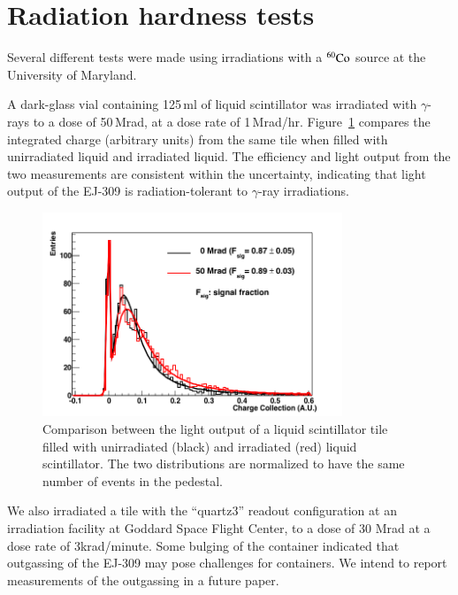 \documentclass[review]{elsarticle}
\begin{document}
\section{Radiation hardness tests}

Several different tests were made using irradiations with a
$\rm{^{60}Co}$ source at the University of Maryland.

A dark-glass vial containing 125\,ml
of liquid scintillator was irradiated with $\gamma$-rays to a
dose of 50\,Mrad, at a dose rate of 1\,Mrad/hr.
Figure~\ref{fig:ej309_irradiated} compares the integrated charge (arbitrary units)
from the same tile when filled with unirradiated liquid and irradiated liquid.
The efficiency and light output from the two measurements are
consistent within the uncertainty, indicating that light output of the EJ-309 is
radiation-tolerant to $\gamma$-ray irradiations.

\begin{figure}[!ht]
\begin{center}
\includegraphics[width=0.8\textwidth]{./figures/RD_R7600_1_0_DBF_ALM_GRS_TH450_100814_all_1.png}
\caption{Comparison between the light output of a liquid scintillator
  tile filled with unirradiated (black) and irradiated (red) liquid
  scintillator. The two distributions are normalized to have the same
  number of events in the pedestal.}
\label{fig:ej309_irradiated}
\end{center}
\end{figure}

We also irradiated a tile with the ``quartz3'' readout configuration
at an irradiation facility at Goddard Space Flight Center, to a dose of 30 Mrad
at a dose rate of 3krad/minute.
Some bulging of the container indicated that outgassing of the EJ-309 
may pose challenges for containers.  We intend to report measurements of the outgassing in a future paper.
\end{document}
